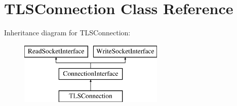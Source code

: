 \hypertarget{class_t_l_s_connection}{}\section{T\+L\+S\+Connection Class Reference}
\label{class_t_l_s_connection}
Inheritance diagram for T\+L\+S\+Connection\+:\begin{figure}[H]
\begin{center}
\leavevmode
\includegraphics[height=3.000000cm]{class_t_l_s_connection}
\end{center}
\end{figure}
